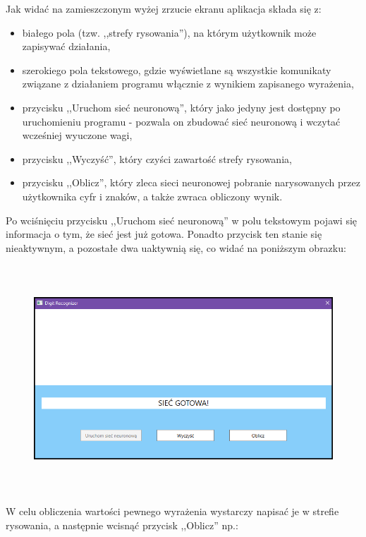 \documentclass[12pt,a4paper]{article}
\begin{document}
\noindent Jak widać na zamieszczonym wyżej zrzucie ekranu aplikacja składa się z:
	\begin{itemize}
	\item białego pola (tzw. ,,strefy rysowania''), na którym użytkownik może zapisywać działania,
	\item szerokiego pola tekstowego, gdzie wyświetlane są wszystkie komunikaty związane z działaniem programu włącznie z wynikiem zapisanego wyrażenia,
	\item przycisku ,,Uruchom sieć neuronową'', który jako jedyny jest dostępny po uruchomieniu programu - pozwala on zbudować sieć neuronową i wczytać wcześniej wyuczone wagi,
	\item przycisku ,,Wyczyść'', który czyści zawartość strefy rysowania,
	\item przycisku ,,Oblicz'', który zleca sieci neuronowej pobranie narysowanych przez użytkownika cyfr i znaków, a także zwraca obliczony wynik.
	\end{itemize}
	

Po wciśnięciu przycisku ,,Uruchom sieć neuronową'' w polu tekstowym pojawi się informacja o tym, że sieć jest już gotowa. Ponadto przycisk ten stanie się nieaktywnym, a pozostałe dwa uaktywnią się, co widać na poniższym obrazku:

	\begin{figure}[h!]
	\centering
	\includegraphics[height=8.5cm]{graphics/app2.png}
	\end{figure}
	
	\vspace{40pt}
W celu obliczenia wartości pewnego wyrażenia wystarczy napisać je w strefie rysowania, a następnie wcisnąć przycisk ,,Oblicz'' np.:
\end{document}
